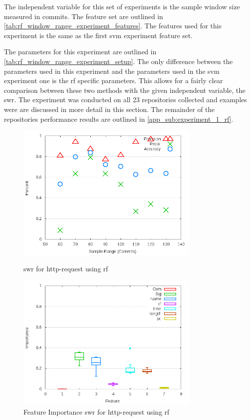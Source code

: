 The independent variable for this set of experiments is the sample window size measured in commits. The feature set are outlined in \autoref{tab:rf_window_range_experiment_features}. The features used for this experiment is the same as the first \gls{svm} experiment feature set.

The parameters for this experiment are outlined in \autoref{tab:rf_window_range_experiment_setup}. The only difference between the parameters used in this experiment and the parameters used in the \gls{svm} experiment one is the \gls{rf} specific parameters. This allows for a fairly clear comparison between these two methods with the given independent variable, the \gls{swr}. The experiment was conducted on all 23 repositories collected and examples were are discussed in more detail in this section. The remainder of the repositories performance results are outlined in \autoref{app_sub:experiment_1_rf}.


\begin{figure}[!ht]
    \centering

        \includegraphics[width=0.8\textwidth]{images/rf/test_1/http-request_sample_range}
        \caption{\gls{swr} for http-request using \gls{rf}}
        \label{fig:test_1_http-request_rf}

    \includegraphics[width=0.8\textwidth]{images/rf/test_1/http-request_importance}
        \caption{Feature Importance \gls{swr} for http-request using \gls{rf}}
        \label{fig:test_1_http-request_rf_importance}
\end{figure}

